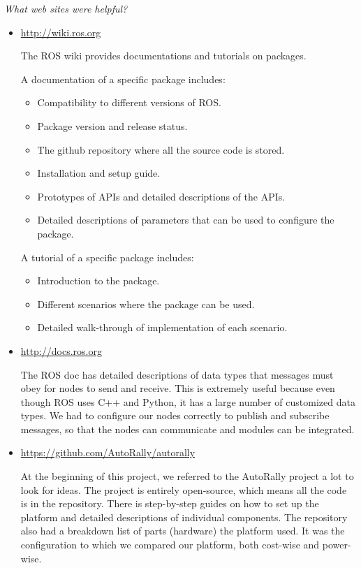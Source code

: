 \documentclass[compsoc,draftclsnofoot,onecolumn,10pt]{IEEEtran}
\begin{document}
\textit{What web sites were helpful?}
\begin{itemize}
    \item \url{http://wiki.ros.org}\par
        The ROS wiki provides documentations and tutorials on packages.\par
        A documentation of a specific package includes:
        \begin{itemize}
            \item Compatibility to different versions of ROS.
            \item Package version and release status.
            \item The github repository where all the source code is stored.
            \item Installation and setup guide.
            \item Prototypes of APIs and detailed descriptions of the APIs.
            \item Detailed descriptions of parameters that can be used to configure the package.
        \end{itemize}
         A tutorial of a specific package includes:
        \begin{itemize}
            \item Introduction to the package.
            \item Different scenarios where the package can be used.
            \item Detailed walk-through of implementation of each scenario.
        \end{itemize}
    \item \url{http://docs.ros.org}\par
        The ROS doc has detailed descriptions of data types that messages must obey for nodes to send and receive. This is extremely useful because even though ROS uses C++ and Python, it has a large number of customized data types. We had to configure our nodes correctly to publish and subscribe messages, so that the nodes can communicate and modules can be integrated.
    \item \url{https://github.com/AutoRally/autorally}\par
        At the beginning of this project, we referred to the AutoRally project a lot to look for ideas. The project is entirely open-source, which means all the code is in the repository. There is step-by-step guides on how to set up the platform and detailed descriptions of individual components. The repository also had a breakdown list of parts (hardware) the platform used. It was the configuration to which we compared our platform, both cost-wise and power-wise.
\end{itemize}
\end{document}
